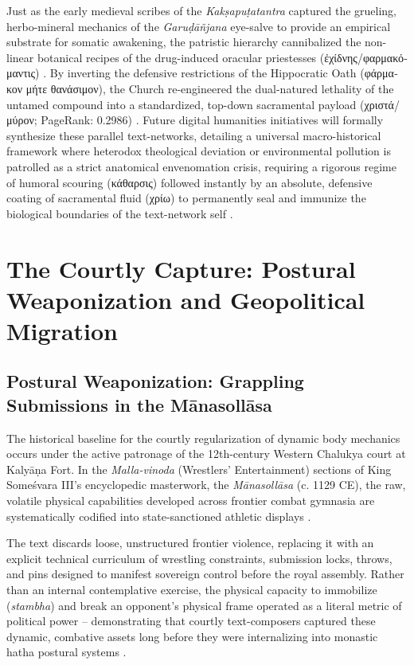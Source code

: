 \documentclass[11pt,twoside,letterpaper]{article}
\begin{document}
Just as the early medieval scribes of the \textit{Kakṣapuṭatantra} captured the grueling, herbo-mineral mechanics of the \textit{Garuḍāñjana} eye-salve to provide an empirical substrate for somatic awakening, the patristic hierarchy cannibalized the non-linear botanical recipes of the drug-induced oracular priestesses (\textgreek{ἐχίδνης}/\textgreek{φαρμακόμαντις}) \citep{Wujastyk2025, McCartneyForthcomingD}. By inverting the defensive restrictions of the Hippocratic Oath (\textgreek{φάρμακον μήτε θανάσιμον}), the Church re-engineered the dual-natured lethality of the untamed compound into a standardized, top-down sacramental payload (\textgreek{χριστά}/\textgreek{μύρον}; PageRank: 0.2986) \citep{McCartneyForthcomingD}. Future digital humanities initiatives will formally synthesize these parallel text-networks, detailing a universal macro-historical framework where heterodox theological deviation or environmental pollution is patrolled as a strict anatomical envenomation crisis, requiring a rigorous regime of humoral scouring (\textgreek{κάθαρσις}) followed instantly by an absolute, defensive coating of sacramental fluid (\textgreek{χρίω}) to permanently seal and immunize the biological boundaries of the text-network self \citep{McCartneyForthcomingD}.

\section{The Courtly Capture: Postural Weaponization and Geopolitical Migration}

\subsection{Postural Weaponization: Grappling Submissions in the Mānasollāsa}
The historical baseline for the courtly regularization of dynamic body mechanics occurs under the active patronage of the 12th-century Western Chalukya court at Kalyāṇa Fort. In the \textit{Malla-vinoda} (Wrestlers’ Entertainment) sections of King Someśvara III’s encyclopedic masterwork, the \textit{Mānasollāsa} (c. 1129 CE), the raw, volatile physical capabilities developed across frontier combat gymnasia are systematically codified into state-sanctioned athletic displays \citep{Mān_3}. 

The text discards loose, unstructured frontier violence, replacing it with an explicit technical curriculum of wrestling constraints, submission locks, throws, and pins designed to manifest sovereign control before the royal assembly. Rather than an internal contemplative exercise, the physical capacity to immobilize (\textit{stambha}) and break an opponent’s physical frame operated as a literal metric of political power – demonstrating that courtly text-composers captured these dynamic, combative assets long before they were internalizing into monastic hatha postural systems \citep{OHanlon2007}.
\end{document}

